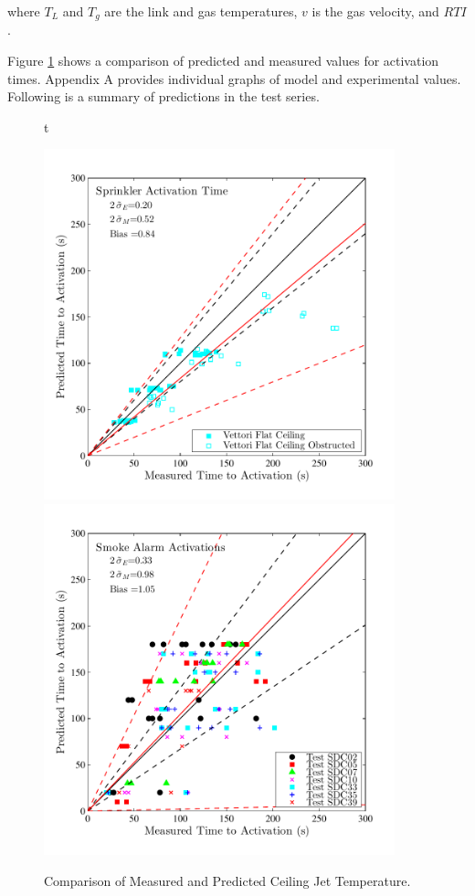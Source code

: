 where $T_L$ and $T_g$ are the link and gas temperatures, $v$ is the gas velocity, and $RTI$.

Figure \ref{fig:Activation_Scatter} shows a comparison of predicted and measured values for activation times. Appendix A provides individual graphs of model and experimental values. Following is a summary of predictions in the test series.

\begin{figure}{t}
\begin{center}
\includegraphics[width=4.0in]{FIGURES/ScatterPlots/Sprinkler_Activation_Time}  \\
\includegraphics[width=4.0in]{FIGURES/ScatterPlots/Smoke_Alarm_Activation_Time}
\end{center}
\caption{Comparison of Measured and Predicted Ceiling Jet Temperature.} \label{fig:Activation_Scatter}
\end{figure}

